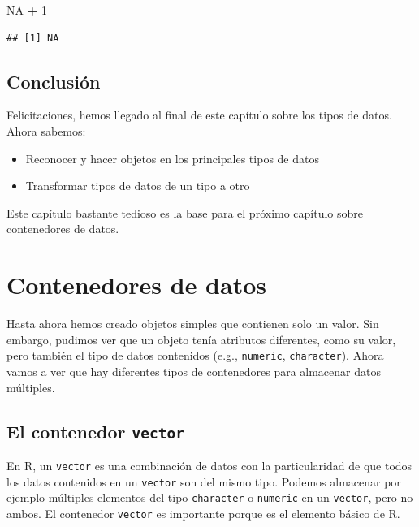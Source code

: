 \documentclass[]{book}
\newenvironment{Shaded}{\begin{snugshade}}{\end{snugshade}}
\newcommand{\DecValTok}[1]{\textcolor[rgb]{0.00,0.00,0.81}{#1}}
\newcommand{\StringTok}[1]{\textcolor[rgb]{0.31,0.60,0.02}{#1}}
\newcommand{\OtherTok}[1]{\textcolor[rgb]{0.56,0.35,0.01}{#1}}
\newcommand{\OperatorTok}[1]{\textcolor[rgb]{0.81,0.36,0.00}{\textbf{#1}}}
\providecommand{\tightlist}{%
  \setlength{\itemsep}{0pt}\setlength{\parskip}{0pt}}
\begin{document}
\begin{Shaded}
\begin{Highlighting}[]
\OtherTok{NA} \OperatorTok{+}\StringTok{ }\DecValTok{1}
\end{Highlighting}
\end{Shaded}

\begin{verbatim}
## [1] NA
\end{verbatim}

\section{Conclusión}\label{conclusion-2}

Felicitaciones, hemos llegado al final de este capítulo sobre los tipos
de datos. Ahora sabemos:

\begin{itemize}
\tightlist
\item
  Reconocer y hacer objetos en los principales tipos de datos
\item
  Transformar tipos de datos de un tipo a otro
\end{itemize}

Este capítulo bastante tedioso es la base para el próximo capítulo sobre
contenedores de datos.

\chapter{Contenedores de datos}\label{dataType2}

Hasta ahora hemos creado objetos simples que contienen solo un valor.
Sin embargo, pudimos ver que un objeto tenía atributos diferentes, como
su valor, pero también el tipo de datos contenidos (e.g.,
\texttt{numeric}, \texttt{character}). Ahora vamos a ver que hay
diferentes tipos de contenedores para almacenar datos múltiples.

\section{\texorpdfstring{El contenedor
\texttt{vector}}{El contenedor vector}}\label{el-contenedor-vector}

En R, un \texttt{vector} es una combinación de datos con la
particularidad de que todos los datos contenidos en un \texttt{vector}
son del mismo tipo. Podemos almacenar por ejemplo múltiples elementos
del tipo \texttt{character} o \texttt{numeric} en un \texttt{vector},
pero no ambos. El contenedor \texttt{vector} es importante porque es el
elemento básico de R.
\end{document}
